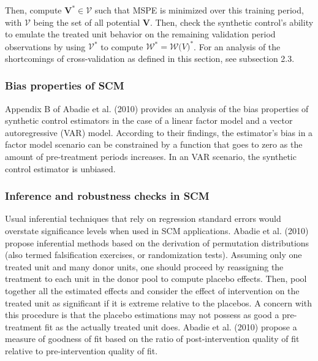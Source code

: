 \documentclass[12pt,a4paper,draft]{article}
\begin{document}
Then, compute $\mathbf{V}^* \in \mathcal{V}$ such that MSPE is minimized over this 
training period, with 
$\mathcal{V}$ being the set of all potential $\mathbf{V}$. Then, check the synthetic 
control's ability to emulate the treated unit behavior on the remaining validation 
period observations by using $\mathcal{V}^*$ to compute $\mathcal{W}^*=\mathcal{W} 
\mathcal(V)^*$.
\newline For an analysis of the shortcomings of cross-validation as defined in this 
section, see subsection 2.3.



\subsubsection{Bias properties of SCM}

Appendix B of Abadie et al. (2010) provides an analysis of the bias properties of synthetic 
control estimators in the case of a linear factor model and a vector autoregressive 
(VAR) model. According to their findings, the estimator's bias in a factor model 
scenario can be constrained by a function that goes to zero as the amount of 
pre-treatment periods increases. In an VAR scenario, the synthetic control 
estimator is unbiased.





\subsubsection{Inference and robustness checks in SCM}
Usual inferential techniques that rely on regression standard errors would overstate significance 
levels when used in SCM applications. 
Abadie et al. (2010) propose inferential methods based on the derivation of permutation distributions
(also termed falsification exercises, or randomization tests). 
Assuming only one treated unit and many donor units, one should proceed by reassigning the 
treatment to each unit in the donor pool to compute placebo effects. Then,  pool together all the 
estimated effects and consider the effect of intervention on the treated unit as significant if 
it is extreme relative to the placebos.
A concern with this procedure is that the placebo estimations may not possess as good a pre-treatment 
fit as the actually treated unit does. Abadie et al. (2010) propose a measure of goodness of fit 
based on the ratio of post-intervention quality of fit relative to pre-intervention quality of fit. 
\end{document}
